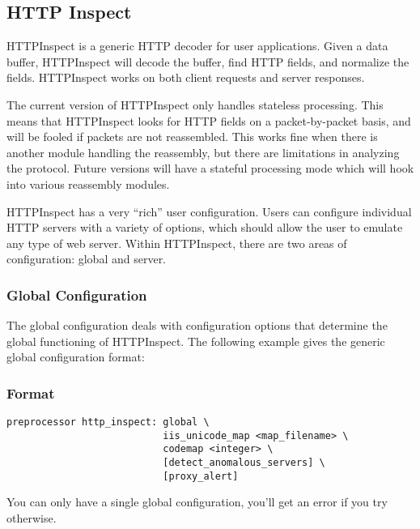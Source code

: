 \documentclass[english]{report}
\begin{document}
\subsection{HTTP Inspect \label{sub:http-inspect}}

HTTPInspect is a generic HTTP decoder for user applications.  Given a data
buffer, HTTPInspect will decode the buffer, find HTTP fields, and normalize the
fields.  HTTPInspect works on both client requests and server responses.

The current version of HTTPInspect only handles stateless processing.  This
means that HTTPInspect looks for HTTP fields on a packet-by-packet basis, and
will be fooled if packets are not reassembled.  This works fine when there is
another module handling the reassembly, but there are limitations in analyzing
the protocol.  Future versions will have a stateful processing mode which will
hook into various reassembly modules.

HTTPInspect has a very ``rich'' user configuration.  Users can configure
individual HTTP servers with a variety of options, which should allow the user
to emulate any type of web server. Within HTTPInspect, there are two areas of
configuration: global and server.

\subsubsection{Global Configuration}

The global configuration deals with configuration options that determine the
global functioning of HTTPInspect.  The following example gives the generic
global configuration format:

\subsubsection{Format}
\begin{verbatim}
preprocessor http_inspect: global \
                           iis_unicode_map <map_filename> \
                           codemap <integer> \
                           [detect_anomalous_servers] \
                           [proxy_alert]
\end{verbatim}

You can only have a single global configuration, you'll get an error if you try
otherwise.
\end{document}
